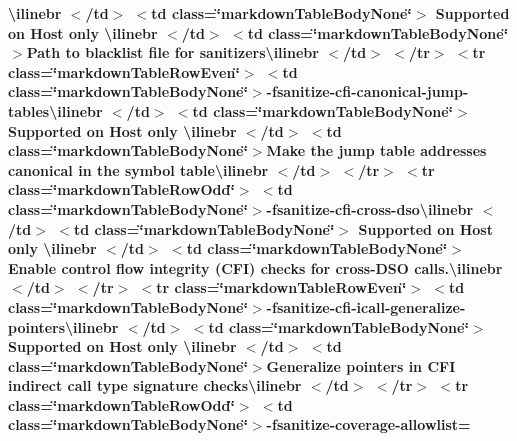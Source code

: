 \begin{longtabu}
{\bfseries{{\ttfamily \textbackslash{}ilinebr \texorpdfstring{$<$}{<}/td\texorpdfstring{$>$}{>} \texorpdfstring{$<$}{<}td class=\char`\"{}markdown\+Table\+Body\+None\char`\"{}\texorpdfstring{$>$}{>} Supported on Host only \textbackslash{}ilinebr \texorpdfstring{$<$}{<}/td\texorpdfstring{$>$}{>} \texorpdfstring{$<$}{<}td class=\char`\"{}markdown\+Table\+Body\+None\char`\"{}\texorpdfstring{$>$}{>}}Path to blacklist file for sanitizers{\ttfamily \textbackslash{}ilinebr \texorpdfstring{$<$}{<}/td\texorpdfstring{$>$}{>} \texorpdfstring{$<$}{<}/tr\texorpdfstring{$>$}{>} \texorpdfstring{$<$}{<}tr class=\char`\"{}markdown\+Table\+Row\+Even\char`\"{}\texorpdfstring{$>$}{>} \texorpdfstring{$<$}{<}td class=\char`\"{}markdown\+Table\+Body\+None\char`\"{}\texorpdfstring{$>$}{>}}-\/fsanitize-\/cfi-\/canonical-\/jump-\/tables{\ttfamily \textbackslash{}ilinebr \texorpdfstring{$<$}{<}/td\texorpdfstring{$>$}{>} \texorpdfstring{$<$}{<}td class=\char`\"{}markdown\+Table\+Body\+None\char`\"{}\texorpdfstring{$>$}{>} Supported on Host only \textbackslash{}ilinebr \texorpdfstring{$<$}{<}/td\texorpdfstring{$>$}{>} \texorpdfstring{$<$}{<}td class=\char`\"{}markdown\+Table\+Body\+None\char`\"{}\texorpdfstring{$>$}{>}}Make the jump table addresses canonical in the symbol table{\ttfamily \textbackslash{}ilinebr \texorpdfstring{$<$}{<}/td\texorpdfstring{$>$}{>} \texorpdfstring{$<$}{<}/tr\texorpdfstring{$>$}{>} \texorpdfstring{$<$}{<}tr class=\char`\"{}markdown\+Table\+Row\+Odd\char`\"{}\texorpdfstring{$>$}{>} \texorpdfstring{$<$}{<}td class=\char`\"{}markdown\+Table\+Body\+None\char`\"{}\texorpdfstring{$>$}{>}}-\/fsanitize-\/cfi-\/cross-\/dso{\ttfamily \textbackslash{}ilinebr \texorpdfstring{$<$}{<}/td\texorpdfstring{$>$}{>} \texorpdfstring{$<$}{<}td class=\char`\"{}markdown\+Table\+Body\+None\char`\"{}\texorpdfstring{$>$}{>} Supported on Host only \textbackslash{}ilinebr \texorpdfstring{$<$}{<}/td\texorpdfstring{$>$}{>} \texorpdfstring{$<$}{<}td class=\char`\"{}markdown\+Table\+Body\+None\char`\"{}\texorpdfstring{$>$}{>}}Enable control flow integrity (CFI) checks for cross-\/\+DSO calls.{\ttfamily \textbackslash{}ilinebr \texorpdfstring{$<$}{<}/td\texorpdfstring{$>$}{>} \texorpdfstring{$<$}{<}/tr\texorpdfstring{$>$}{>} \texorpdfstring{$<$}{<}tr class=\char`\"{}markdown\+Table\+Row\+Even\char`\"{}\texorpdfstring{$>$}{>} \texorpdfstring{$<$}{<}td class=\char`\"{}markdown\+Table\+Body\+None\char`\"{}\texorpdfstring{$>$}{>}}-\/fsanitize-\/cfi-\/icall-\/generalize-\/pointers{\ttfamily \textbackslash{}ilinebr \texorpdfstring{$<$}{<}/td\texorpdfstring{$>$}{>} \texorpdfstring{$<$}{<}td class=\char`\"{}markdown\+Table\+Body\+None\char`\"{}\texorpdfstring{$>$}{>} Supported on Host only \textbackslash{}ilinebr \texorpdfstring{$<$}{<}/td\texorpdfstring{$>$}{>} \texorpdfstring{$<$}{<}td class=\char`\"{}markdown\+Table\+Body\+None\char`\"{}\texorpdfstring{$>$}{>}}Generalize pointers in CFI indirect call type signature checks{\ttfamily \textbackslash{}ilinebr \texorpdfstring{$<$}{<}/td\texorpdfstring{$>$}{>} \texorpdfstring{$<$}{<}/tr\texorpdfstring{$>$}{>} \texorpdfstring{$<$}{<}tr class=\char`\"{}markdown\+Table\+Row\+Odd\char`\"{}\texorpdfstring{$>$}{>} \texorpdfstring{$<$}{<}td class=\char`\"{}markdown\+Table\+Body\+None\char`\"{}\texorpdfstring{$>$}{>}}-\/fsanitize-\/coverage-\/allowlist=}}


\end{longtabu}
